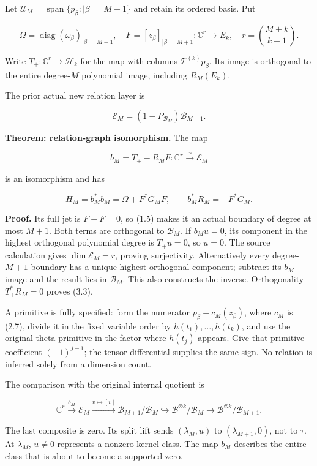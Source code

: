 \documentclass[
]{article}
\begin{document}
Let \(\mathcal U_M=\operatorname{span}\{p_\beta:|\beta|=M+1\}\) and
retain its ordered basis. Put

\[\Omega=\operatorname{diag}(\omega_\beta)_{|\beta|=M+1},\quad
F=[z_\beta]_{|\beta|=M+1}:\mathbb C^r\to E_k,\quad
r=\binom{M+k}{k-1}.\tag{3.1}\]

Write \(T_+:\mathbb C^r\to\mathcal H_k\) for the map with columns
\(\mathcal T^{(k)}p_\beta\). Its image is orthogonal to the entire
degree-\(M\) polynomial image, including \(R_M(E_k)\).

The prior actual new relation layer is

\[\mathcal E_M=(1-P_{\mathcal B_M})\mathcal B_{M+1}.\]

\textbf{Theorem: relation-graph isomorphism.} The map

\[\boxed{b_M=T_+-R_MF:\mathbb C^r\xrightarrow{\sim}\mathcal E_M}\tag{3.2}\]

is an isomorphism and has

\[\boxed{H_M=b_M^*b_M=\Omega+F^*G_MF,\qquad b_M^*R_M=-F^*G_M.}\tag{3.3}\]

\textbf{Proof.} Its full jet is \(F-F=0\), so (1.5) makes it an actual
boundary of degree at most \(M+1\). Both terms are orthogonal to
\(\mathcal B_M\). If \(b_Mu=0\), its component in the highest orthogonal
polynomial degree is \(T_+u=0\), so \(u=0\). The source calculation
gives \(\dim\mathcal E_M=r\), proving surjectivity. Alternatively every
degree-\(M+1\) boundary has a unique highest orthogonal component;
subtract its \(b_M\) image and the result lies in \(\mathcal B_M\). This
also constructs the inverse. Orthogonality \(T_+^*R_M=0\) proves (3.3).

A primitive is fully specified: form the numerator
\(p_\beta-c_M(z_\beta)\), where \(c_M\) is (2.7), divide it in the fixed
variable order by \(h(t_1),\ldots,h(t_k)\), and use the original theta
primitive in the factor where \(h(t_j)\) appears. Give that primitive
coefficient \((-1)^{j-1}\); the tensor differential supplies the same
sign. No relation is inferred solely from a dimension count.

The comparison with the original internal quotient is

\[\mathbb C^r\xrightarrow{b_M}\mathcal E_M
\xrightarrow{v\mapsto[v]}\mathcal B_{M+1}/\mathcal B_M
\hookrightarrow\mathscr B^{\otimes k}/\mathcal B_M
\longrightarrow\mathscr B^{\otimes k}/\mathcal B_{M+1}.\tag{3.4}\]

The last composite is zero. Its split lift sends \((\lambda_M,u)\) to
\((\lambda_{M+1},0)\), not to \(\tau\). At \(\lambda_M\), \(u\ne0\)
represents a nonzero kernel class. The map \(b_M\) describes the entire
class that is about to become a supported zero.
\end{document}
